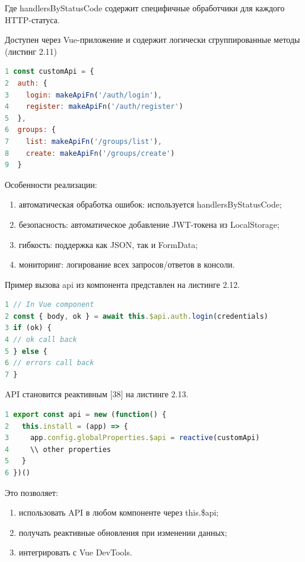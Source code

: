\documentclass[a4paper,14pt,oneside]{extreport}
\begin{document}
Где handlersByStatusCode содержит специфичные обработчики для каждого HTTP-статуса.


Доступен через Vue-приложение и содержит логически сгруппированные методы (листинг 2.11)

\begin{lstlisting}[language=JavaScript, caption=Структура API,breaklines=true]
1 const customApi = {
2  auth: {
3    login: makeApiFn('/auth/login'),
4    register: makeApiFn('/auth/register')
5  },
6  groups: {
7    list: makeApiFn('/groups/list'),
8    create: makeApiFn('/groups/create')
9  }

\end{lstlisting}

Особенности реализации:
\begin{enumerate}[label=\arabic*)]
    \item автоматическая обработка ошибок: используется handlersByStatusCode;
    \item безопасность: автоматическое добавление JWT-токена из LocalStorage;
    \item гибкость: поддержка как JSON, так и FormData;
    \item мониторинг: логирование всех запросов/ответов в консоли.
\end{enumerate}

Пример вызова api из компонента представлен на листинге 2.12.

\begin{lstlisting}[language=JavaScript, caption=Пример вызова,breaklines=true]
1 // In Vue component
2 const { body, ok } = await this.$api.auth.login(credentials)
3 if (ok) {
4 // ok call back
5 } else {
6 // errors call back
7 }
\end{lstlisting}

API становится реактивным [38] на листинге 2.13.

\begin{lstlisting}[language=JavaScript, caption={Интеграция с Vue},breaklines=true]
1 export const api = new (function() {
2   this.install = (app) => {
3     app.config.globalProperties.$api = reactive(customApi)
4     \\ other properties
5   }
6 })()
\end{lstlisting}

Это позволяет:
\begin{enumerate}[label=\arabic*)]
    \item использовать API в любом компоненте через this.\$api;
    \item получать реактивные обновления при изменении данных;
    \item интегрировать с Vue DevTools.
\end{enumerate}
\end{document}
